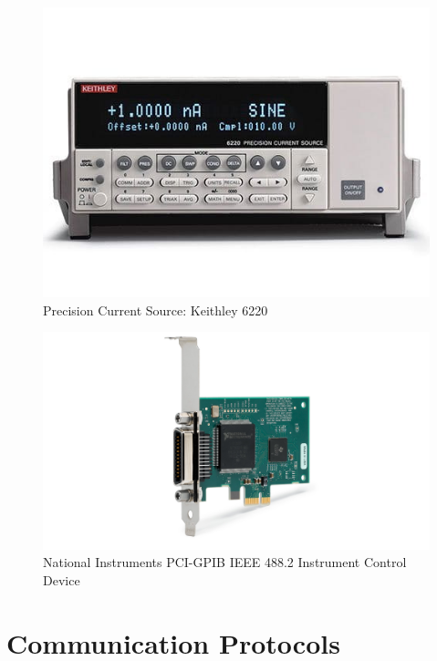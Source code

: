 \documentclass[12pt, titlepage]{article}
\begin{document}
\begin{figure}[H]
\centerline{\includegraphics[scale=0.5]{3.jpg}}
\caption{Precision Current Source: Keithley 6220}
\label{fig}
\end{figure}

\begin{figure}[H]
\centerline{\includegraphics[scale=0.25]{4.png}}
\caption{National Instruments PCI-GPIB IEEE 488.2 Instrument Control Device}
\label{fig}
\end{figure}

\section{Communication Protocols}
\label{Apx.D}
\end{document}
